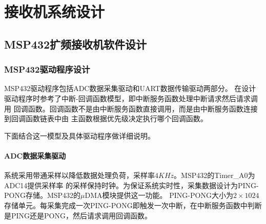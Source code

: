 \chapter{接收机系统设计}

\section{MSP432扩频接收机软件设计}
\subsection{MSP432驱动程序设计}
	MSP432驱动程序包括ADC数据采集驱动和UART数据传输驱动两部分。
在设计驱动程序时参考了中断-回调函数模型，即中断服务函数处理中断请求然后请求调用
回调函数。回调函数不是由中断服务函数直接调用，而是由中断服务函数连接到回调函数链表中由
主函数根据优先级决定执行哪个回调函数。

	下面结合这一模型及具体驱动程序做详细说明。

\subsubsection{ADC数据采集驱动}
	系统采用带通采样以降低数据处理负荷，采样率$4KHz$。MSP432的Timer\_A0为ADC14提供采样率
的采样保持时钟。为保证系统实时性，采集数据设计为PING-PONG存储。MSP432的$\mu$DMA模块提供这一功能。
PING-PONG大小为$2\times1024$存储单元。每采集完成一次PING-PONG即触发一次中断，在中断服务函数中判断
是PING还是PONG，然后请求调用回调函数。

